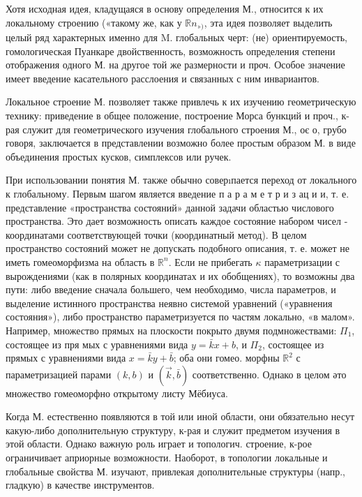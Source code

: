 \documentclass[10pt]{article}
\begin{document}
Хотя исходная идея, кладущаяся в основу определения М., относится к их локальному строению («такому же, как у $\mathbb{R} n_{»)}$, эта идея позволяет выделить целый ряд характерных именно для M. глобальных черт: (не) ориентируемость, гомологическая Пуанкаре двойственность, возможность определения степени отображения одного М. на другое той же размерности и проч. Особое значение имеет введение касательного расслоения и связанных с ним инвариантов.



Локальное строение М. позволяет также привлечь к их изучению геометрическую технику: приведение в общее положение, построение Морса бункций и проч., к-рая служит для геометрического изучения глобального строения М., оє о, грубо говоря, заключается в представлении возможно более простым образом М. в виде объединения простых кусков, симплексов или ручек.



При использовании понятия М. также обычно соверıпается переход от локального к глобальному. Первым шагом является введение п а р а м е т р и з ац и и, т. е. представление «пространства состояний» данной задачи областью числового пространства. Это дает возможность описать каждое состояние набором чисел - координатами соответствующей точки (координатный метод). В целом пространство состояний может не допускать подобного описания, т. е. может не иметь гомеоморфизма на область в $\mathbb{R}^{n}$. Если не прибегать $\kappa$ параметризации с вырождениями (как в полярных координатах и их обобщениях), то возможны два пути: либо введение сначала большего, чем необходимо, числа параметров, и выделение истинного пространства неявно системой уравнений («уравнения состояния»), либо пространство параметризуется по частям локально, «в малом». Например, множество прямых на плоскости покрыто двумя подмножествами: $\Pi_{1}$, состоящее из пря мых с уравнениями вида $y=\bar{k} x+b$, и $\Pi_{2}$, состоящее из прямых с уравнениями вида $x=\bar{k} y+\bar{b}$; оба они гомео. морфны $\mathbb{R}^{2}$ с параметризацией парами $(k, b)$ и $(\vec{k}, \bar{b})$ соответственно. Однако в целом әто множество гомеоморфно открытому листу Мёбиуса.



Когда М. естественно появляются в той или иной области, они обязательно несут какую-либо дополнительную структуру, к-рая и служит предметом изучения в этой области. Однако важную роль играет и топологич. строение, к-рое ограничивает априорные возможности. Наоборот, в топологии локальные и глобальные свойства М. изучают, привлекая дополнительные структуры (напр., гладкую) в качестве инструментов.
\end{document}

